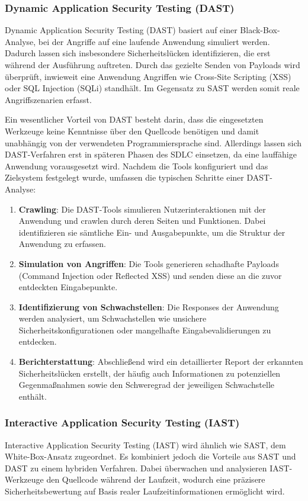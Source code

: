 \documentclass[acmtog]{acmart}
\begin{document}
\subsubsection{Dynamic Application Security Testing (DAST)}
Dynamic Application Security Testing (DAST) basiert auf einer Black-Box-Analyse, bei der Angriffe auf eine laufende Anwendung simuliert werden. 
Dadurch lassen sich insbesondere Sicherheitslücken identifizieren, die erst während der Ausführung auftreten.
Durch das gezielte Senden von Payloads wird überprüft, inwieweit eine Anwendung Angriffen wie Cross-Site Scripting (XSS) oder SQL Injection (SQLi) standhält.
Im Gegensatz zu SAST werden somit reale Angriffszenarien erfasst. \cite{singh_analysis_2024}

Ein wesentlicher Vorteil von DAST besteht darin, dass die eingesetzten Werkzeuge keine Kenntnisse über den Quellcode benötigen und damit unabhängig von der verwendeten Programmiersprache sind.
Allerdings lassen sich DAST-Verfahren erst in späteren Phasen des SDLC einsetzen, da eine lauffähige Anwendung vorausgesetzt wird.
Nachdem die Tools konfiguriert und das Zielsystem festgelegt wurde, umfassen die typischen Schritte einer DAST-Analyse: \cite{singh_analysis_2024}

\begin{enumerate}
	\item \textbf{Crawling}: Die DAST-Tools simulieren Nutzerinteraktionen mit der Anwendung und crawlen durch deren Seiten und Funktionen. Dabei identifizieren sie sämtliche Ein- und Ausgabepunkte, um die Struktur der Anwendung zu erfassen.
	\item \textbf{Simulation von Angriffen}: Die Tools generieren schadhafte Payloads (Command Injection oder Reflected XSS) und senden diese an die zuvor entdeckten Eingabepunkte.
	\item \textbf{Identifizierung von Schwachstellen}: Die Responses der Anwendung werden analysiert, um Schwachstellen wie unsichere Sicherheitskonfigurationen oder mangelhafte Eingabevalidierungen zu entdecken.
	\item \textbf{Berichterstattung}: Abschließend wird ein detaillierter Report der erkannten Sicherheitslücken erstellt, der häufig auch Informationen zu potenziellen Gegenmaßnahmen sowie den Schweregrad der jeweiligen Schwachstelle enthält.
\end{enumerate}


\subsubsection{Interactive Application Security Testing (IAST)}
Interactive Application Security Testing (IAST) wird ähnlich wie SAST, dem White-Box-Ansatz zugeordnet. 
Es kombiniert jedoch die Vorteile aus SAST und DAST zu einem hybriden Verfahren.
Dabei überwachen und analysieren IAST-Werkzeuge den Quellcode während der Laufzeit, wodurch eine präzisere Sicherheitsbewertung auf Basis realer Laufzeitinformationen ermöglicht wird. \cite{mateo_tudela_combining_2020}
\end{document}
